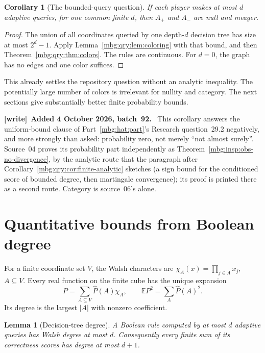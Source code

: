 \documentclass[11pt,letterpaper]{article}
\newtheorem{lemma}[theorem]{Lemma}
\newtheorem{corollary}[theorem]{Corollary}
\theoremstyle{definition}
\newcommand{\E}{\mathbb E}
\newenvironment{writenote}[1][]{\par\smallskip\begingroup\small
 \noindent\textbf{[write]}\if\relax\detokenize{#1}\relax\else~\textbf{#1.}\fi\ }%
 {\par\endgroup\smallskip}
\begin{document}
\begin{corollary}[The bounded-query question]
\label{mbg:qry:cor:bounded}
If each player makes at most \(d\) adaptive queries, for one common
finite \(d\), then \(A_+\) and \(A_-\) are null and meager.
\end{corollary}

\begin{proof}
The union of all coordinates queried by one depth-\(d\) decision tree
has size at most \(2^d-1\). Apply Lemma~\ref{mbg:qry:lem:coloring} with that
bound, and then Theorem~\ref{mbg:qry:thm:colors}. The rules are continuous.
For \(d=0\), the graph has no edges and one color suffices.
\end{proof}

This already settles the repository question without an analytic
inequality. The potentially large number of colors is irrelevant for
nullity and category. The next sections give substantially better
finite probability bounds.

\begin{writenote}[Added 4 October 2026, batch~92]
This corollary answers the uniform-bound clause of Part~\ref{mbg:hat:part}'s Research question~29.2 negatively, and more strongly than asked: probability zero, not merely ``not almost surely''. Source~04 proves its probability part independently as Theorem~\ref{mbg:insp:obs-no-divergence}, by the analytic route that the paragraph after Corollary~\ref{mbg:qry:cor:finite-analytic} sketches (a sign bound for the conditioned score of bounded degree, then martingale convergence); its proof is printed there as a second route. Category is source~06's alone.
\end{writenote}

\section{Quantitative bounds from Boolean degree}
\label{mbg:qry:sec:fourier}

For a finite coordinate set \(V\), the Walsh characters are
\(\chi_A(x)=\prod_{j\in A}x_j\), \(A\subseteq V\).
Every real function on the finite cube has the unique expansion
\[
 P=\sum_{A\subseteq V}\widehat P(A)\chi_A,
 \qquad
 \E P^2=\sum_A\widehat P(A)^2.
\]
Its degree is the largest \(|A|\) with nonzero coefficient.

\begin{lemma}[Decision-tree degree]
\label{mbg:qry:lem:degree}
A Boolean rule computed by at most \(d\) adaptive queries has Walsh
degree at most \(d\). Consequently every finite sum of its correctness
scores has degree at most \(d+1\).
\end{lemma}
\end{document}
